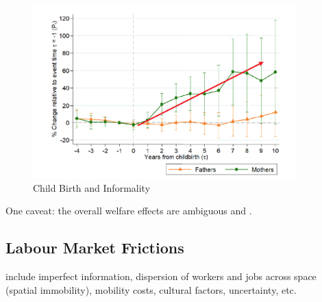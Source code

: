             \begin{figure}[H]
                \centering
                \includegraphics[width=4in]{images/ch6/child cost and informality.png}
                \caption{Child Birth and Informality}
            \end{figure}
            One caveat: the overall welfare effects are ambiguous and .
            
    \subsection{Labour Market Frictions}
         include imperfect information, dispersion of workers and jobs across space (spatial immobility), mobility costs, cultural factors, uncertainty, etc.
        
